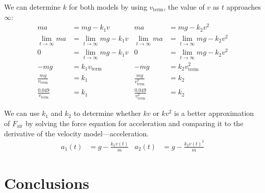 \documentclass{article}
\begin{document}
\noindent
We can determine $k$ for both models by using $v_\text{term}$, the value of $v$ as $t$ approaches $\infty$:
\begin{align*}
    ma &= mg - k_1v & ma &= mg - k_2v^2 \\
    \lim_{t \rightarrow \infty}{ma} &= \lim_{t \rightarrow \infty}{mg - k_1v} & \lim_{t \rightarrow \infty}{ma} &= \lim_{t \rightarrow \infty}{mg - k_2v^2} \\
    0 &= \lim_{t \rightarrow \infty}{mg - k_1v} & 0 &= \lim_{t \rightarrow \infty}{mg - k_2v^2} \\
    -mg &= k_1v_\text{term} & -mg &= k_2v_{\text{term}}^2 \\
    \frac{mg}{v_\text{term}} &= k_1 & \frac{mg}{v_{\text{term}}^2} &= k_2 \\
    \frac{0.049}{v_\text{term}} &= k_1 & \frac{0.049}{v_{\text{term}}^2} &= k_2 
\end{align*}

\noindent
We can use $k_1$ and $k_2$ to determine whether $kv$ or $kv^2$ is a better approximation of $F_\text{air}$ by solving the force equation for acceleration 
and comparing it to the derivative of the velocity model—acceleration.
\begin{align*}
    a_1(t) &= g - \frac{k_1v(t)}{m} & a_2(t) &= g - \frac{k_2v(t)^2}{m} 
\end{align*}


\section{Conclusions}
\end{document}
